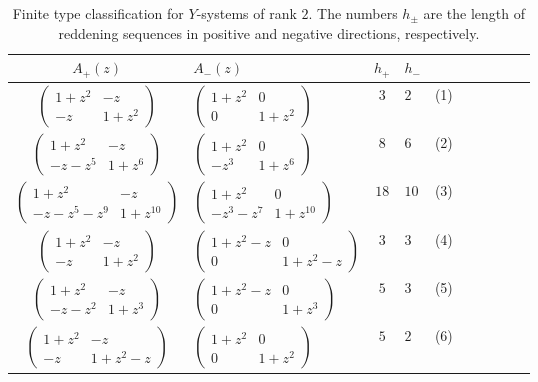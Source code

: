 \documentclass[10pt,a4paper]{amsart}
\numberwithin{equation}{section}
\theoremstyle{definition}
\begin{document}
\begin{table}[t]
 \centering
 \begin{tabular}{ Sl|Sl|Sl|Sl| Sl }
 \hline
 $A_+(z)$ &
 $A_-(z)$ &
 $h_+$ &
 $h_-$ & \\
 \hline
 $\begin{pmatrix}
 1 + z^2 & -z \\
 -z & 1 + z^2
 \end{pmatrix}$ &
 $\begin{pmatrix}
 1 + z^2 & 0 \\
 0 & 1 + z^2
 \end{pmatrix}$ &
 $3$ & $2$ &
 (1) \\
 $\begin{pmatrix}
 1 + z^2 & -z \\
 - z - z^5 & 1 + z^6
 \end{pmatrix}$ &
 $\begin{pmatrix}
 1 + z^2 & 0 \\
 -z^3 & 1 + z^6
 \end{pmatrix}$ &
 $8$ & $6$ &
 (2) \\
 $\begin{pmatrix}
 1 + z^2 & - z \\
 - z - z^5 - z^9 & 1 + z^{10}
 \end{pmatrix}$ &
 $\begin{pmatrix}
 1 + z^2 & 0 \\
 -z^3 - z^7 & 1 + z^{10}
 \end{pmatrix}$ &
 $18$ & $10$ &
 (3) \\
 $\begin{pmatrix}
 1 + z^2 & - z \\
 - z & 1 + z^2
 \end{pmatrix}$ &
 $\begin{pmatrix}
 1 + z^2 - z & 0 \\
 0 & 1 + z^2 - z
 \end{pmatrix}$ &
 $3$ & $3$ &
 (4) \\
 $\begin{pmatrix}
 1 + z^2 & -z \\
 -z -z^2 & 1 + z^3
 \end{pmatrix}$ &
 $\begin{pmatrix}
 1 + z^2 - z & 0 \\
 0 & 1 + z^3
 \end{pmatrix}$ &
 $5$ & $3$ &
 (5) \\
 $\begin{pmatrix}
 1 + z^2 & - z \\
 - z & 1 + z^2 - z
 \end{pmatrix}$ &
 $\begin{pmatrix}
 1 + z^2 & 0 \\
 0 & 1 + z^2
 \end{pmatrix}$ &
 $5$ & $2$ &
 (6) \\
 \hline
 \end{tabular}
\caption{Finite type classification for $Y$-systems of rank $2$. The numbers $h_{\pm}$ are the length of
reddening sequences in positive and negative directions, respectively.}
\label{table:finie type}
\end{table}
\end{document}
